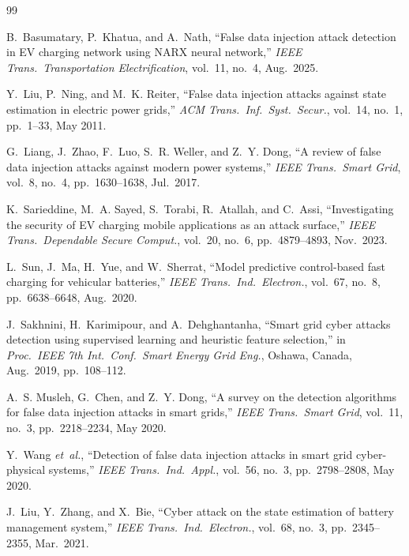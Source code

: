 \documentclass[journal]{IEEEtran}
\begin{document}
\begin{thebibliography}{99}

B.~Basumatary, P.~Khatua, and A.~Nath,
``False data injection attack detection in EV charging network
using NARX neural network,''
\emph{IEEE Trans.\ Transportation Electrification},
vol.~11, no.~4, Aug.~2025.

Y.~Liu, P.~Ning, and M.~K. Reiter,
``False data injection attacks against state estimation in
electric power grids,''
\emph{ACM Trans.\ Inf.\ Syst.\ Secur.},
vol.~14, no.~1, pp.~1--33, May 2011.

G.~Liang, J.~Zhao, F.~Luo, S.~R. Weller, and Z.~Y. Dong,
``A review of false data injection attacks against modern
power systems,''
\emph{IEEE Trans.\ Smart Grid},
vol.~8, no.~4, pp.~1630--1638, Jul.~2017.

K.~Sarieddine, M.~A. Sayed, S.~Torabi, R.~Atallah, and C.~Assi,
``Investigating the security of EV charging mobile applications
as an attack surface,''
\emph{IEEE Trans.\ Dependable Secure Comput.},
vol.~20, no.~6, pp.~4879--4893, Nov.~2023.

L.~Sun, J.~Ma, H.~Yue, and W.~Sherrat,
``Model predictive control-based fast charging for vehicular
batteries,''
\emph{IEEE Trans.\ Ind.\ Electron.},
vol.~67, no.~8, pp.~6638--6648, Aug.~2020.

J.~Sakhnini, H.~Karimipour, and A.~Dehghantanha,
``Smart grid cyber attacks detection using supervised learning
and heuristic feature selection,''
in \emph{Proc.\ IEEE 7th Int.\ Conf.\ Smart Energy Grid Eng.},
Oshawa, Canada, Aug.~2019, pp.~108--112.

A.~S. Musleh, G.~Chen, and Z.~Y. Dong,
``A survey on the detection algorithms for false data injection
attacks in smart grids,''
\emph{IEEE Trans.\ Smart Grid},
vol.~11, no.~3, pp.~2218--2234, May 2020.

Y.~Wang \emph{et~al.},
``Detection of false data injection attacks in smart grid
cyber-physical systems,''
\emph{IEEE Trans.\ Ind.\ Appl.},
vol.~56, no.~3, pp.~2798--2808, May 2020.

J.~Liu, Y.~Zhang, and X.~Bie,
``Cyber attack on the state estimation of battery management
system,''
\emph{IEEE Trans.\ Ind.\ Electron.},
vol.~68, no.~3, pp.~2345--2355, Mar.~2021.


\end{thebibliography}
\end{document}
